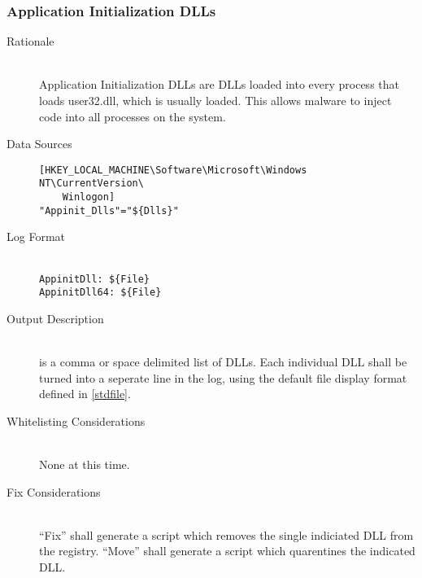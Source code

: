 \subsubsection{Application Initialization DLLs}
\begin{description}
\item[Rationale] \hfill \\
Application Initialization DLLs are DLLs loaded into every process that loads
user32.dll, which is usually loaded. This allows malware to inject code into all
processes on the system.
\item[Data Sources] \hfill
\vspace{-\baselineskip}
\begin{verbatim}
[HKEY_LOCAL_MACHINE\Software\Microsoft\Windows NT\CurrentVersion\
    Winlogon]
"Appinit_Dlls"="${Dlls}"
\end{verbatim}
\item[Log Format] \hfill \\
\verb|AppinitDll: ${File}| \\
\verb|AppinitDll64: ${File}|
\item[Output Description] \hfill \\
 is a comma or space delimited list of DLLs. Each individual DLL shall
be turned into a seperate line in the log, using the default file display format
defined in \ref{stdfile}.
\item[Whitelisting Considerations] \hfill \\
None at this time.
\item[Fix Considerations] \hfill \\
``Fix'' shall generate a script which removes the single indiciated DLL from the
registry. ``Move'' shall generate a script which quarentines the indicated DLL.
\end{description}

